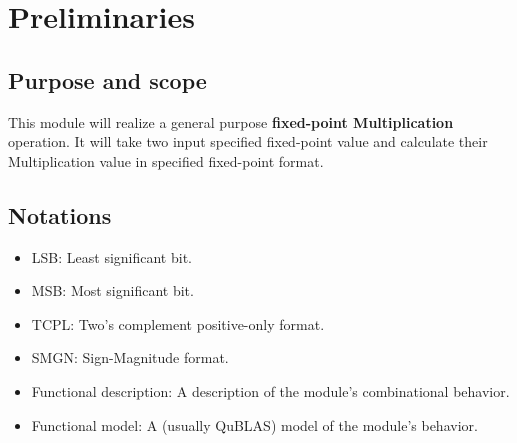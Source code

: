 \documentclass[a4paper, oneside]{report}
\author{Bolin Li}
\date{2024.11.29}
\begin{document}
    \setmainfont{TeX Gyre Heros}
    \maketitle
    \tableofcontents
    \thispagestyle{empty}
    \clearpage
    \pagestyle{fancy}
    \setcounter{page}{1}
    \chapter{Preliminaries}
        \section{Purpose and scope}
        This module will realize a general purpose \textbf{fixed-point Multiplication} operation. It will take two input specified fixed-point value and calculate their Multiplication value in specified fixed-point format.
        \section{Notations}
            \begin{itemize}
                \item LSB: Least significant bit.
                \item MSB: Most significant bit.
                \item TCPL: Two's complement positive-only format.
                \item SMGN: Sign-Magnitude format.
                \item Functional description: A description of the module's combinational behavior.
                \item Functional model: A (usually QuBLAS) model of the module's behavior.
            \end{itemize}
\end{document}
